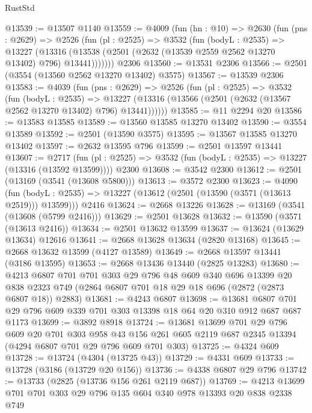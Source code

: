 \begin{lexlean}{RustStd}
\begin{coremodule}
{\begin{coremodule}
{{{{{{{{{{{{{{{{{{{{@13539 := @13507 @1140
@13559 := @4009
    (fun (hn : @10) =>
    @2630
      (fun (pns : @2629) =>
      @2526
        (fun (pl : @2525) =>
        @3532
          (fun (bodyL : @2535) =>
          @13227
            (@13316 (@13538 (@2501 (@2632 (@13539 @2559 @2562 @13270 @13402) @796) @13441)))))))
    @2306
@13560 := @13531 @2306
@13566 := @2501 (@3554 (@13560 @2562 @13270 @13402) @3575)
@13567 := @13539 @2306
@13583 := @4039
    (fun (pns : @2629) =>
    @2526
      (fun (pl : @2525) =>
      @3532
        (fun (bodyL : @2535) =>
        @13227 (@13316 (@13566 (@2501 (@2632 (@13567 @2562 @13270 @13402) @796) @13441))))))
@13585 := @11 @2294 @20
@13586 := @13583 @13585
@13589 := @13560 @13585 @13270 @13402
@13590 := @3554 @13589
@13592 := @2501 (@13590 @3575)
@13595 := @13567 @13585 @13270 @13402
@13597 := @2632 @13595 @796
@13599 := @2501 @13597 @13441
@13607 := @2717
    (fun (pl : @2525) => @3532 (fun (bodyL : @2535) => @13227 (@13316 (@13592 @13599))))
    @2300
@13608 := @3542 @2300
@13612 := @2501 (@13169 (@3541 (@13608 @5800)))
@13613 := @3572 @2300
@13623 := @4090
    (fun (bodyL : @2535) => @13227 (@13612 (@2501 (@13590 (@3571 (@13613 @2519))) @13599)))
    @2416
@13624 := @2668 @13226
@13628 := @13169 (@3541 (@13608 (@5799 @2416)))
@13629 := @2501 @13628
@13632 := @13590 (@3571 (@13613 @2416))
@13634 := @2501 @13632 @13599
@13637 := @13624 (@13629 @13634) @12616
@13641 := @2668 @13628 @13634 (@2820 @13168)
@13645 := @2668 @13632 @13599 (@4127 @13589)
@13649 := @2668 @13597 @13441 (@3186 @13595)
@13653 := @2668 @13436 @13440 (@2825 @13283)
@13680 := @4213
    @6807
    @701
    @701
    @303
    @29
    @796
    @48
    @609
    @340
    @696
    @13399
    @20
    @838
    @2323
    @749
    (@2864 @6807 @701 @18 @29 @18 @696 (@2872 (@2873 @6807 @18)) @2883)
@13681 := @4243 @6807
@13698 := @13681
    @6807
    @701
    @29
    @796
    @609
    @339
    @701
    @303
    @13398
    @18
    @64
    @20
    @310
    @912
    @687
    @687
    @1173
@13699 := @3892 @8918
@13724 := @13681
    @13699
    @701
    @29
    @796
    @609
    @20
    @701
    @303
    @958
    @43
    @156
    @261
    @605
    @2119
    @687
    @2345
    @13394
    (@4294 @6807 @701 @29 @796 @609 @701 @303)
@13725 := @4324 @609
@13728 := @13724 (@4304 (@13725 @43))
@13729 := @4331 @609
@13733 := @13728 (@3186 (@13729 @20 @156))
@13736 := @4338 @6807 @29 @796
@13742 := @13733 (@2825 (@13736 @156 @261 @2119 @687))
@13769 := @4213
    @13699
    @701
    @701
    @303
    @29
    @796
    @135
    @604
    @340
    @978
    @13393
    @20
    @838
    @2338
    @749
}}}}}}}}}}}}}}}}}}}}
\end{coremodule}}
\end{coremodule}
\end{lexlean}
